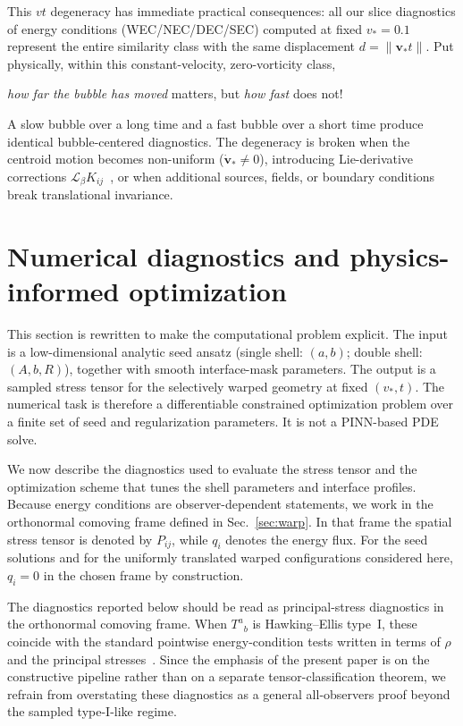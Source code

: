 \documentclass[11pt]{article}
\makeatletter
\newcommand{\@abbr}[1]{\ifmmode\mathrm{#1}\else\textsc{#1}\fi}
\newcommand{\WEC}{\@abbr{WEC}}
\newcommand{\NEC}{\@abbr{NEC}}
\newcommand{\SEC}{\@abbr{SEC}}
\newcommand{\DEC}{\@abbr{DEC}}
\makeatother
\begin{document}
This $vt$ degeneracy has immediate practical consequences: all our slice diagnostics of energy conditions (\WEC/\NEC/\DEC/\SEC) computed at fixed $v_*=0.1$ represent the entire similarity class with the same displacement $d=\|\mathbf v_* t\|$. Put physically, within this constant-velocity, zero-vorticity class,
\begin{center}
    \emph{how far the bubble has moved} matters, but \emph{how fast} does not!
\end{center}
A slow bubble over a long time and a fast bubble over a short time produce identical bubble-centered diagnostics. The degeneracy is broken when the centroid motion becomes non-uniform ($\dot{\mathbf v}_*\neq0$), introducing Lie-derivative corrections $\mathcal{L}_\beta K_{ij}$~\cite{Santiago:2021aup}, or when additional sources, fields, or boundary conditions break translational invariance.


\section{Numerical diagnostics and physics-informed optimization}
\label{sec:numerics}

This section is rewritten to make the computational problem explicit. The input is a low-dimensional analytic seed ansatz (single shell: $(a,b)$; double shell: $(A,b,R)$), together with smooth interface-mask parameters. The output is a sampled stress tensor for the selectively warped geometry at fixed $(v_*,t)$. The numerical task is therefore a differentiable constrained optimization problem over a finite set of seed and regularization parameters. It is not a PINN-based PDE solve.

We now describe the diagnostics used to evaluate the stress tensor and the optimization scheme that tunes the shell parameters and interface profiles.  Because energy conditions are observer-dependent statements, we work in the orthonormal comoving frame defined in Sec.~\ref{sec:warp}. In that frame the spatial stress tensor is denoted by $P_{ij}$, while $q_i$ denotes the energy flux. For the seed solutions and for the uniformly translated warped configurations considered here, $q_i=0$ in the chosen frame by construction.

The diagnostics reported below should be read as principal-stress diagnostics in the orthonormal comoving frame. When $T^{a}{}_{b}$ is Hawking--Ellis type~I, these coincide with the standard pointwise energy-condition tests written in terms of $\rho$ and the principal stresses~\cite{HawkingEllis1973,Maeda:2022vld}. Since the emphasis of the present paper is on the constructive pipeline rather than on a separate tensor-classification theorem, we refrain from overstating these diagnostics as a general all-observers proof beyond the sampled type-I-like regime.
\end{document}
